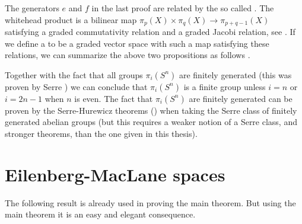 The generators $e$ and $f$ in the last proof are related by the so called . The whitehead product is a bilinear map $\pi_p(X) \times \pi_q(X) \to \pi_{p+q-1}(X)$ satisfying a graded commutativity relation and a graded Jacobi relation, see \cite{felix}. If we define a  to be a graded vector space with such a map satisfying these relations, we can summarize the above two propositions as follows \cite{berglund}.


Together with the fact that all groups $\pi_i(S^n)$ are finitely generated (this was proven by Serre \cite{serre}) we can conclude that $\pi_i(S^n)$ is a finite group unless $i=n$ or $i=2n-1$ when $n$ is even. The fact that $\pi_i(S^n)$ are finitely generated can be proven by the Serre-Hurewicz theorems () when taking the Serre class of finitely generated abelian groups (but this requires a weaker notion of a Serre class, and stronger theorems, than the one given in this thesis).


\section{Eilenberg-MacLane spaces}

The following result is already used in proving the main theorem. But using the main theorem it is an easy and elegant consequence.



